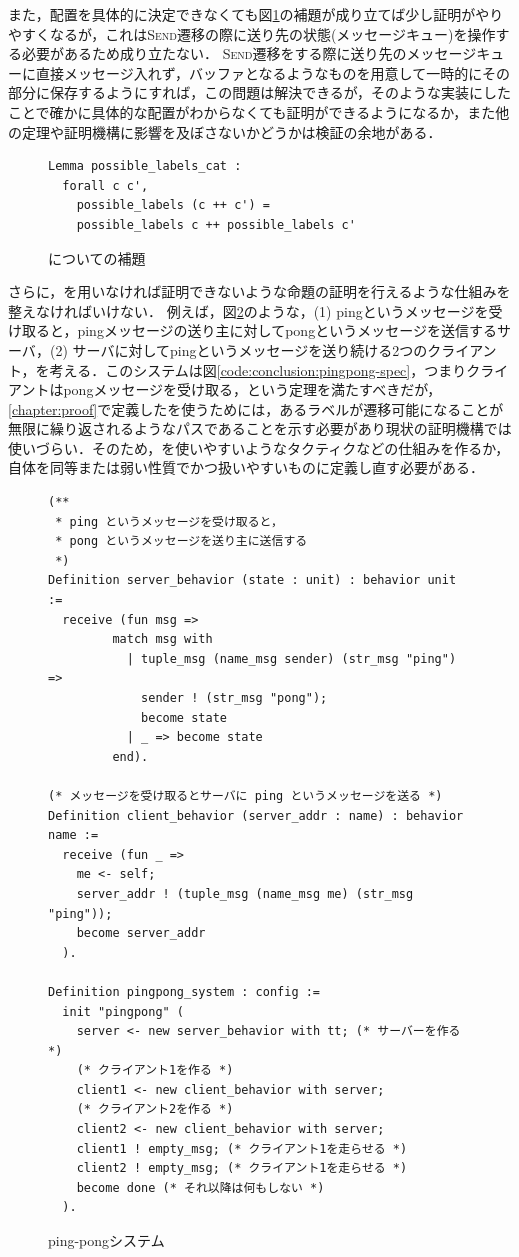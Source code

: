また，配置を具体的に決定できなくても図\ref{code:conclusion:possible-labels-cat}の補題が成り立てば少し証明がやりやすくなるが，これは\textsc{Send}遷移の際に送り先の状態(メッセージキュー)を操作する必要があるため成り立たない．
\textsc{Send}遷移をする際に送り先のメッセージキューに直接メッセージ入れず，バッファとなるようなものを用意して一時的にその部分に保存するようにすれば，この問題は解決できるが，そのような実装にしたことで確かに具体的な配置がわからなくても証明ができるようになるか，また他の定理や証明機構に影響を及ぼさないかどうかは検証の余地がある．


\begin{figure}[tp]
\begin{lstlisting}
Lemma possible_labels_cat :
  forall c c',
    possible_labels (c ++ c') =
    possible_labels c ++ possible_labels c'
\end{lstlisting}
\caption{についての補題}\label{code:conclusion:possible-labels-cat}
\end{figure}


さらに，\fairness を用いなければ証明できないような命題の証明を行えるような仕組みを整えなければいけない．
例えば，図\ref{code:conclusion:pingpong}のような，(1) pingというメッセージを受け取ると，pingメッセージの送り主に対してpongというメッセージを送信するサーバ，(2) サーバに対してpingというメッセージを送り続ける2つのクライアント，を考える．このシステムは図\ref{code:conclusion:pingpong-spec}，つまりクライアントはpongメッセージを受け取る，という定理を満たすべきだが，
\ref{chapter:proof}で定義したを使うためには，あるラベルが遷移可能になることが無限に繰り返されるようなパスであることを示す必要があり現状の証明機構では使いづらい．そのため，を使いやすいようなタクティクなどの仕組みを作るか，自体を同等または弱い性質でかつ扱いやすいものに定義し直す必要がある．

\begin{figure}[tp]
\begin{lstlisting}
(**
 * ping というメッセージを受け取ると，
 * pong というメッセージを送り主に送信する
 *)
Definition server_behavior (state : unit) : behavior unit :=
  receive (fun msg =>
         match msg with
           | tuple_msg (name_msg sender) (str_msg "ping") =>
             sender ! (str_msg "pong");
             become state
           | _ => become state
         end).

(* メッセージを受け取るとサーバに ping というメッセージを送る *)
Definition client_behavior (server_addr : name) : behavior name :=
  receive (fun _ =>
    me <- self;
    server_addr ! (tuple_msg (name_msg me) (str_msg "ping"));
    become server_addr
  ).

Definition pingpong_system : config :=
  init "pingpong" (
    server <- new server_behavior with tt; (* サーバーを作る *)
    (* クライアント1を作る *)
    client1 <- new client_behavior with server;
    (* クライアント2を作る *)
    client2 <- new client_behavior with server;
    client1 ! empty_msg; (* クライアント1を走らせる *)
    client2 ! empty_msg; (* クライアント1を走らせる *)
    become done (* それ以降は何もしない *)
  ).
\end{lstlisting}
  \caption{ping-pongシステム}\label{code:conclusion:pingpong}
\end{figure}

